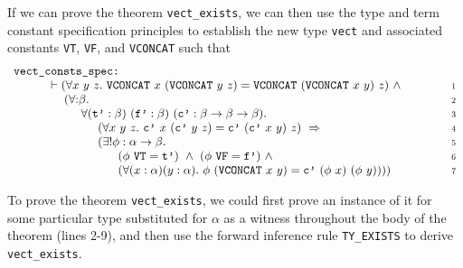If we can prove the theorem \texttt{vect\_exists}, we can then use the type
and term constant specification principles to establish the new type \texttt{vect}
and associated constants \texttt{VT}, \texttt{VF}, and \texttt{VCONCAT} such that
%
\[
\begin{array}[t]{l@{\hspace{5mm}}l@{\hspace{15mm}}r}
\multicolumn{3}{l}{
\mbox{\tt vect\_consts\_spec:}} \\
 & \hspace{6mm}
   \vdash
   (\forall x\ y\ z.\ \mbox{\tt VCONCAT}\ x\ (\mbox{\tt VCONCAT}\ y\ z) =
                      \mbox{\tt VCONCAT}\ (\mbox{\tt VCONCAT}\ x\ y)\ z) \ \wedge &
\mbox{\scriptsize \textsc{1}} \\
 & \hspace{10mm}
   (\forall{:} \beta. &
\mbox{\scriptsize \textsc{2}} \\
 & \hspace{15mm}
    \forall (\mbox{\tt t'}:\beta)\ (\mbox{\tt f'}:\beta)\ 
            (\mbox{\tt c'}:\beta \rightarrow \beta \rightarrow \beta). &
\mbox{\scriptsize \textsc{3}} \\
 & \hspace{20mm}
   (\forall x\ y\ z.\ \mbox{\tt c'}\ x\ (\mbox{\tt c'}\ y\ z) =
                      \mbox{\tt c'}\ (\mbox{\tt c'}\ x\ y)\ z) \ \Rightarrow &
\mbox{\scriptsize \textsc{4}} \\
 & \hspace{20mm}
   (\exists ! \phi : \alpha \rightarrow \beta. &
\mbox{\scriptsize \textsc{5}} \\
 & \hspace{26mm}
   (\phi\ \mbox{\tt VT} = \mbox{\tt t'}) \ \wedge \ 
   (\phi\ \mbox{\tt VF} = \mbox{\tt f'}) \ \wedge &
\mbox{\scriptsize \textsc{6}} \\
 & \hspace{26mm}
   (\forall (x:\alpha) (y:\alpha).\ \phi\ (\mbox{\tt VCONCAT}\ x\ y) =
                                    \mbox{\tt c'}\ (\phi\ x)\ (\phi\ y)))) &
\mbox{\scriptsize \textsc{7}} 
\end{array}
\]

To prove the theorem \texttt{vect\_exists}, we could first prove an
instance of it for some particular type substituted for $\alpha$ as a witness
throughout the body of the theorem (lines 2-9),
and then use the forward inference rule \texttt{TY\_EXISTS} to derive
\texttt{vect\_exists}.

